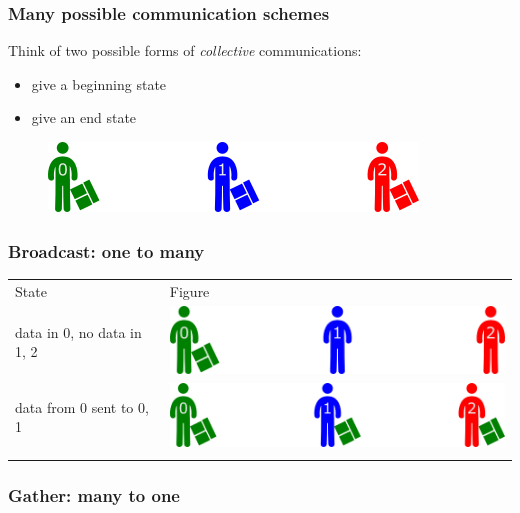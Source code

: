 \subsubsection{Many possible communication
schemes}\label{many-possible-communication-schemes}

Think of two possible forms of \emph{collective} communications:

\begin{itemize}
\itemsep1pt\parskip0pt
\item
  give a beginning state
\item
  give an end state
\end{itemize}

\begin{figure}[htbp]
\centering
\includegraphics{06MPI/figures/collective.png}
\end{figure}

\subsubsection{Broadcast: one to many}\label{broadcast-one-to-many}

\begin{longtable}[c]{@{}ll@{}}
\toprule\addlinespace
State & Figure
\\\addlinespace
\midrule\endhead
data in 0, no data in 1, 2 &
\includegraphics{06MPI/figures/broadcast0.png}
\\\addlinespace
data from 0 sent to 0, 1 &
\includegraphics{06MPI/figures/broadcast1.png}
\\\addlinespace
\bottomrule
\end{longtable}

\subsubsection{Gather: many to one}\label{gather-many-to-one}

